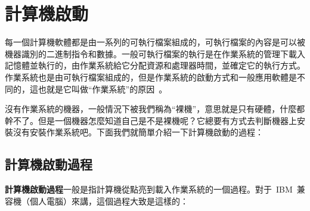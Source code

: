 \chapter{計算機啟動} \label{CHboot}

每一個計算機軟體都是由一系列的可執行檔案組成的，可執行檔案的內容是可以被機器識別的二進制指令和數據。一般可執行檔案的執行是在作業系統的管理下載入記憶體並執行的，由作業系統給它分配資源和處理器時間，並確定它的執行方式。作業系統也是由可執行檔案組成的，但是作業系統的啟動方式和一般應用軟體是不同的，這也就是它叫做``作業系統''的原因~\smiley。

沒有作業系統的機器，一般情況下被我們稱為``裸機''，意思就是只有硬體，什麼都幹不了。但是一個機器怎麼知道自己是不是裸機呢？它總要有方式去判斷機器上安裝沒有安裝作業系統吧。下面我們就簡單介紹一下計算機啟動的過程：

\section{計算機啟動過程} \label{CHboot_boot}

\textbf{計算機啟動過程}一般是指計算機從點亮到載入作業系統的一個過程。對于~IBM~兼容機（個人電腦）來講，這個過程大致是這樣的：

